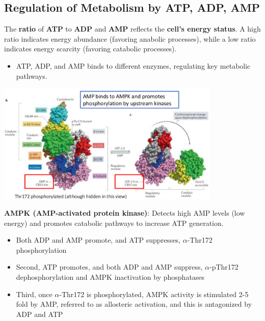 \documentclass[10pt]{article}
\begin{document}
\subsection*{Regulation of Metabolism by ATP, ADP, AMP}
The \textbf{ratio} of \textbf{ATP} to \textbf{ADP} and \textbf{AMP} reflects the \textbf{cell's energy status}.  A high ratio indicates energy abundance (favoring anabolic processes), while a low ratio indicates energy scarcity (favoring catabolic processes).
\begin{itemize}
	\item ATP, ADP, and AMP binds to different enzymes, regulating key metabolic pathways.
\end{itemize}
\begin{center}
    \includegraphics*[width=0.8\textwidth]{L2_8.png}
\end{center}
\pagebreak
\textbf{AMPK (AMP-activated protein kinase)}: Detects high AMP levels (low energy) and promotes catabolic pathways to increase ATP generation.
\begin{itemize}
	\item Both ADP and AMP promote, and ATP suppresses, $\alpha$-Thr172 phosphorylation
	\item Second, ATP promotes, and both ADP and AMP suppress, $\alpha$-pThr172 dephosphorylation and AMPK inactivation by phosphatases
	\item Third, once $\alpha$-Thr172 is phosphorylated, AMPK activity is stimulated 2-5 fold by AMP, referred to as allosteric activation, and this is antagonized by ADP and ATP
\end{itemize}
\end{document}
